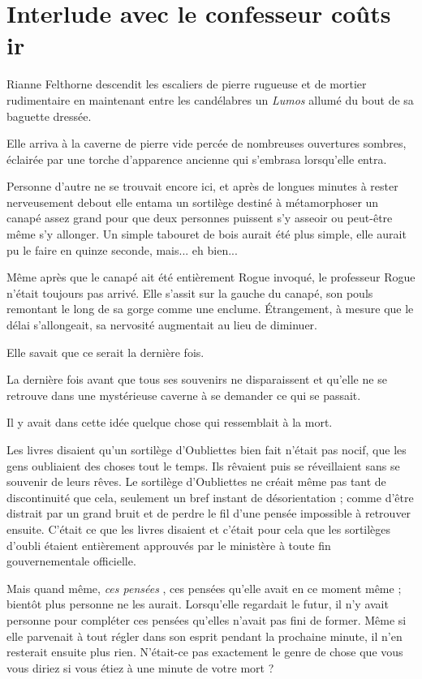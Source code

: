 
\chapter{Interlude avec le confesseur   coûts ir}

Rianne Felthorne descendit les escaliers de pierre rugueuse et de mortier rudimentaire en maintenant entre les candélabres un \emph{Lumos}  allumé du bout de sa baguette dressée.

Elle arriva à la caverne de pierre vide percée de nombreuses ouvertures sombres, éclairée par une torche d'apparence ancienne qui s'embrasa lorsqu'elle entra.

Personne d'autre ne se trouvait encore ici, et après de longues minutes à rester nerveusement debout elle entama un sortilège destiné à métamorphoser un canapé assez grand pour que deux personnes puissent s'y asseoir ou peut-être même s'y allonger. Un simple tabouret de bois aurait été plus simple, elle aurait pu le faire en quinze seconde, mais... eh bien...

Même après que le canapé ait été entièrement Rogue invoqué, le professeur Rogue n'était toujours pas arrivé. Elle s'assit sur la gauche du canapé, son pouls remontant le long de sa gorge comme une enclume. Étrangement, à mesure que le délai s'allongeait, sa nervosité augmentait au lieu de diminuer.

Elle savait que ce serait la dernière fois.

La dernière fois avant que tous ses souvenirs ne disparaissent et qu'elle ne se retrouve dans une mystérieuse caverne à se demander ce qui se passait.

Il y avait dans cette idée quelque chose qui ressemblait à la mort.

Les livres disaient qu'un sortilège d'Oubliettes bien fait n'était pas nocif, que les gens oubliaient des choses tout le temps. Ils rêvaient puis se réveillaient sans se souvenir de leurs rêves. Le sortilège d'Oubliettes ne créait même pas tant de discontinuité que cela, seulement un bref instant de désorientation ; comme d'être distrait par un grand bruit et de perdre le fil d'une pensée impossible à retrouver ensuite. C'était ce que les livres disaient et c'était pour cela que les sortilèges d'oubli étaient entièrement approuvés par le ministère à toute fin gouvernementale officielle.

Mais quand même, \emph{ces pensées} , ces pensées qu'elle avait en ce moment même ; bientôt plus personne ne les aurait. Lorsqu'elle regardait le futur, il n'y avait personne pour compléter ces pensées qu'elles n'avait pas fini de former. Même si elle parvenait à tout régler dans son esprit pendant la prochaine minute, il n'en resterait ensuite plus rien. N'était-ce pas exactement le genre de chose que vous vous diriez si vous étiez à une minute de votre mort ?

